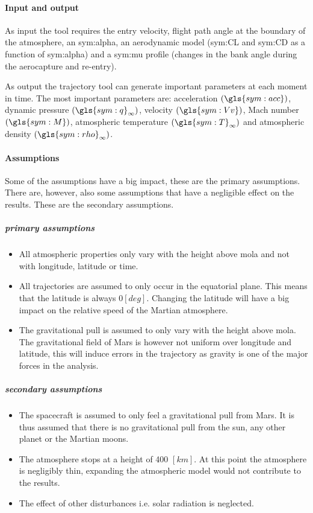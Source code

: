 \paragraph{Input and output}
As input the tool requires the entry velocity, flight path angle at the boundary of the atmosphere, an \gls{sym:alpha}, an aerodynamic model (\gls{sym:CL} and \gls{sym:CD} as a function of \gls{sym:alpha}) and a \gls{sym:mu} profile (changes in the bank angle during the aerocapture and re-entry).

As output the trajectory tool can generate important parameters at each moment in time. The most important parameters are: acceleration $\left(\gls{sym:acc}\right)$, dynamic pressure $\left(\gls{sym:q}_{\infty}\right)$, velocity $\left(\gls{sym:Vv}\right)$, Mach number $\left(\gls{sym:M}\right)$, atmospheric temperature $\left(\gls{sym:T}_{\infty}\right)$ and atmospheric density $\left(\gls{sym:rho}_{\infty}\right)$.

\paragraph{Assumptions}
 \label{sec:astroassumption}
 Some of the assumptions have a big impact, these are the primary assumptions. There are, however, also some assumptions that have a negligible effect on the results. These are the secondary assumptions.
 
 \subparagraph{primary assumptions}
 \begin{itemize}
 \item All atmospheric properties only vary with the height above \gls{mola} and not with longitude, latitude or time. 
 \item All trajectories are assumed to only occur in the equatorial plane. This means that the latitude is always $0 \left[deg\right]$. Changing the latitude will have a big impact on the relative speed of the Martian atmosphere.
 \item The gravitational pull is assumed to only vary with the height above \gls{mola}. The gravitational field of Mars is however not uniform over longitude and latitude, this will induce errors in the trajectory as gravity is one of the major forces in the analysis.
 \end{itemize}

 \subparagraph{secondary assumptions}
 \begin{itemize}
 \item The spacecraft is assumed to only feel a gravitational pull from Mars. It is thus assumed that there is no gravitational pull from the sun, any other planet or the Martian moons.
 \item The atmosphere stops at a height of 400 $\left[km\right]$. At this point the atmosphere is negligibly thin, expanding the atmospheric model would not contribute to the results.
 \item The effect of other disturbances i.e. solar radiation is neglected.
 \end{itemize}

